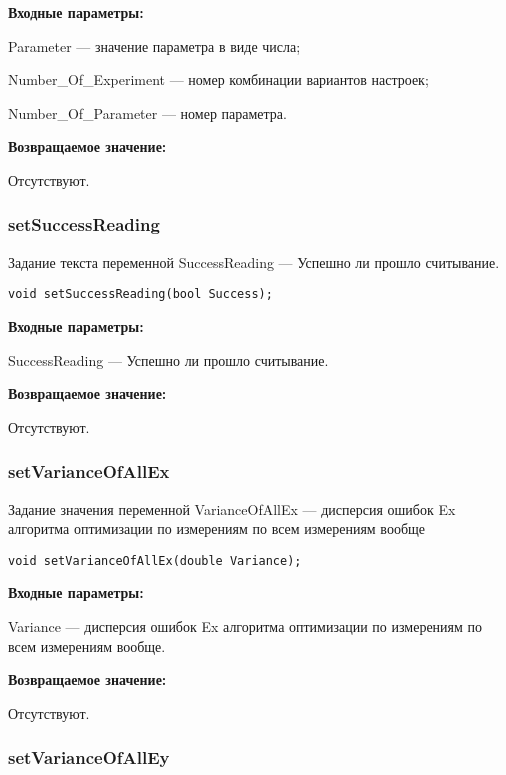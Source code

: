 \documentclass[a4paper,12pt]{article}
\begin{document}
\textbf{Входные параметры:}

	 Parameter --- значение параметра в виде числа;
 
    Number\_Of\_Experiment --- номер комбинации вариантов настроек;
 
    Number\_Of\_Parameter --- номер параметра.

\textbf{Возвращаемое значение:}

Отсутствуют.


\subsubsection{setSuccessReading}\label{setSuccessReading}

Задание текста переменной SuccessReading --- Успешно ли прошло считывание.


\begin{lstlisting}[label=code_syntax_setSuccessReading,caption=Синтаксис]
void setSuccessReading(bool Success);
\end{lstlisting}

\textbf{Входные параметры:}

SuccessReading --- Успешно ли прошло считывание.

\textbf{Возвращаемое значение:}

Отсутствуют.


\subsubsection{setVarianceOfAllEx}\label{setVarianceOfAllEx}

Задание значения переменной VarianceOfAllEx --- дисперсия ошибок Ex алгоритма оптимизации по измерениям по всем измерениям вообще


\begin{lstlisting}[label=code_syntax_setVarianceOfAllEx,caption=Синтаксис]
void setVarianceOfAllEx(double Variance);
\end{lstlisting}

\textbf{Входные параметры:}

Variance --- дисперсия ошибок Ex алгоритма оптимизации по измерениям по всем измерениям вообще.

\textbf{Возвращаемое значение:}

Отсутствуют.


\subsubsection{setVarianceOfAllEy}\label{setVarianceOfAllEy}
\end{document}
